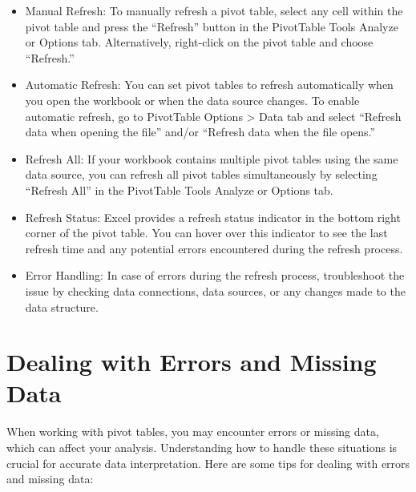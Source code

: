 \documentclass[
]{book}
\begin{document}
\begin{itemize}
\item
  Manual Refresh: To manually refresh a pivot table, select any cell within the pivot table and press the ``Refresh'' button in the PivotTable Tools Analyze or Options tab. Alternatively, right-click on the pivot table and choose ``Refresh.''
\item
  Automatic Refresh: You can set pivot tables to refresh automatically when you open the workbook or when the data source changes. To enable automatic refresh, go to PivotTable Options \textgreater{} Data tab and select ``Refresh data when opening the file'' and/or ``Refresh data when the file opens.''
\item
  Refresh All: If your workbook contains multiple pivot tables using the same data source, you can refresh all pivot tables simultaneously by selecting ``Refresh All'' in the PivotTable Tools Analyze or Options tab.
\item
  Refresh Status: Excel provides a refresh status indicator in the bottom right corner of the pivot table. You can hover over this indicator to see the last refresh time and any potential errors encountered during the refresh process.
\item
  Error Handling: In case of errors during the refresh process, troubleshoot the issue by checking data connections, data sources, or any changes made to the data structure.
\end{itemize}

\hypertarget{dealing-with-errors-and-missing-data}{%
\section{Dealing with Errors and Missing Data}\label{dealing-with-errors-and-missing-data}}

When working with pivot tables, you may encounter errors or missing data, which can affect your analysis. Understanding how to handle these situations is crucial for accurate data interpretation. Here are some tips for dealing with errors and missing data:
\end{document}
